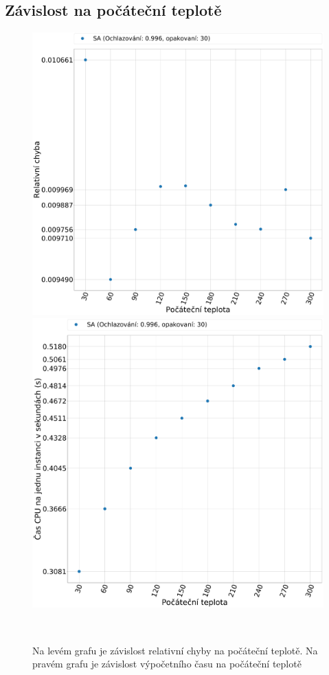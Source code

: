 \documentclass[11pt]{article}
\begin{document}
\subsection{Závislost na počáteční teplotě}
\begin{figure}
	\centering
    \begin{minipage}[c]{0.49\textwidth}
        \centering\includegraphics[width=\textwidth]{img/TE.pdf} 
    \end{minipage}
    \begin{minipage}[c]{0.49\textwidth}
        \centering \includegraphics[width=\textwidth]{img/TT.pdf} 
    \end{minipage}
    \\
   \caption{Na levém grafu je závislost relativní chyby na počáteční teplotě. Na pravém grafu je závislost výpočetního času na počáteční teplotě}\label{fig:GVI}
\end{figure} 
\end{document}
